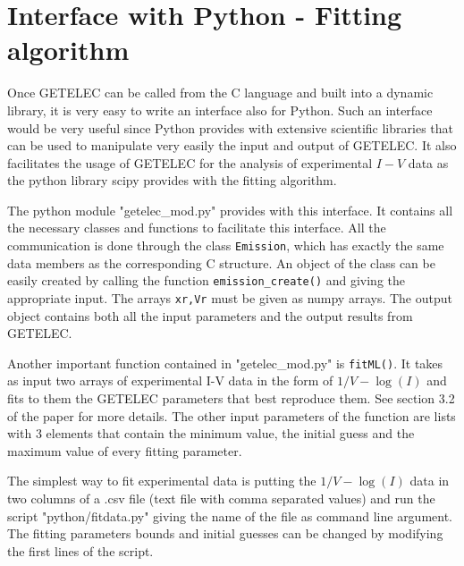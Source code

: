 \documentclass[notitlepage
]{revtex4-1}
\begin{document}
\section{Interface with Python - Fitting algorithm}
\label{sec:Python}

Once GETELEC can be called from the C language and built into a dynamic library, it is very easy to write an interface also for Python. Such an interface would be very useful since Python provides with extensive scientific libraries that can be used to manipulate very easily the input and output of GETELEC. It also facilitates the usage of GETELEC for the analysis of experimental $I-V$ data as the python library scipy provides with the fitting algorithm.

The python module "getelec\_mod.py" provides with this interface. It contains all the necessary classes and functions to facilitate this interface. All the communication is done through the class \texttt{Emission}, which has exactly the same data members as the corresponding C structure. An object of the class can be easily created by calling the function \texttt{emission\_create()} and giving the appropriate input. The arrays \texttt{xr,Vr} must be given as numpy arrays. The output object contains both all the input parameters and the output results from GETELEC.

Another important function contained in "getelec\_mod.py" is \texttt{fitML()}. It takes as input two arrays of experimental I-V data in the form of $1/V-\log(I)$ and fits to them the GETELEC parameters that best reproduce them. See section 3.2 of the paper for more details. The other input parameters of the function are lists with 3 elements that contain the minimum value, the initial guess and the maximum value of every fitting parameter.

The simplest way to fit experimental data is putting the $1/V-\log(I)$ data in two columns of a .csv file (text file with comma separated values) and run the script "python/fitdata.py" giving the name of the file as command line argument. The fitting parameters bounds and initial guesses can be changed by modifying the first lines of the script.
%
\end{document}
